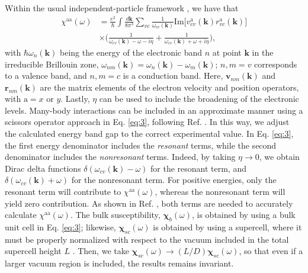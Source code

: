 \documentclass[pss]{wiley2sp} %
\begin{document}
Within the usual independent-particle framework \cite{tancognePRB14}, we have
that
\begin{equation}\label{eq:3}
\begin{split}
\chi^{\mathrm{aa}}(\omega) 
& = \frac{e^{2}}{\hbar}
  \int \frac{d\mathbf{k}}{8\pi^3}
  \sum_{vc} \frac{1}{\omega_{cv}(\mathbf{k})}
  \mathrm{Im}
  \Big[
    v^{\mathrm{a}}_{cv}(\mathbf{k})r^{\mathrm{a}}_{vc}(\mathbf{k})
  \Big] \\
& \times
  \Bigg(
      \frac{1}{\omega_{cv}(\mathbf{k})-\omega-i\eta}
    + \frac{1}{\omega_{cv}(\mathbf{k})+\omega+i\eta}
\Bigg) 
,
\end{split}
\end{equation}
with $\hbar \omega_{n}(\mathbf{k})$ being the energy of the electronic band $n$
at point $\mathbf{k}$ in the irreducible Brillouin zone,
$\omega_{nm}(\mathbf{k}) = \omega_{n}(\mathbf{k}) - \omega_{m}(\mathbf{k})$;
$n,m = v$ corresponds to a valence band, and $n,m = c$ is a conduction band.
Here, $\mathbf{v}_{nm}(\mathbf{k})$ and $\mathbf{r}_{nm}(\mathbf{k})$ are the
matrix elements of the electron velocity and position operators, with
$\mathrm{a} = x$ or $y$. Lastly, $\eta$ can be used to include the broadening of
the electronic levels. {\color{red}Many-body interactions can be included in an approximate
manner using a scissors operator approach in Eq. \eqref{eq:3}, following Ref.}
\cite{andersonPRB15}. In this way, we adjust the calculated energy band gap to
the correct experimental value. In Eq. \eqref{eq:3}, the first energy
denominator includes the \emph{resonant} terms, while the second denominator
includes the \emph{nonresonant} terms. Indeed, by taking $\eta\to 0$, we obtain
Dirac delta functions $\delta(\omega_{cv}(\mathbf{k}) - \omega)$ for the
resonant term, and $\delta(\omega_{cv}(\mathbf{k}) + \omega)$ for the
nonresonant term. For positive energies, only the resonant term will contribute
to $\chi^{\mathrm{aa}}(\omega)$, whereas the nonresonant term will yield zero
contribution. As shown in Ref. \cite{tancognePRB14}, both terms are needed to
accurately calculate $\chi^{\mathrm{aa}}(\omega)$. The bulk susceptibility,
$\boldsymbol{\chi}^{~}_{b}(\omega)$, is obtained by using a bulk unit cell in
Eq. \eqref{eq:3}; likewise, $\boldsymbol{\chi}_{sc}(\omega)$ is obtained by
using a supercell, where it must be properly normalized with respect to the
vacuum included in the total supercell height $L$ \cite{tancognePRB15}. Then, we
take $\boldsymbol{\chi}_{sc}(\omega)\to(L/D)\boldsymbol{\chi}_{sc}(\omega)$, so
that even if a larger vacuum region is included, the results remains invariant.
\end{document}
